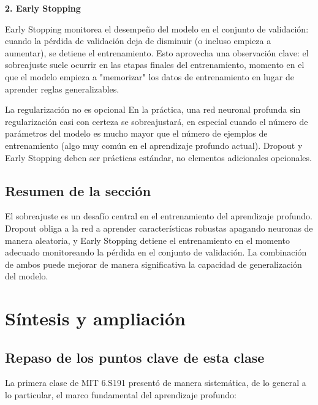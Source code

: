 \documentclass[a4paper]{article}
\begin{document}
\textbf{2. Early Stopping}

Early Stopping monitorea el desempeño del modelo en el conjunto de validación: cuando la pérdida de validación deja de disminuir (o incluso empieza a aumentar), se detiene el entrenamiento. Esto aprovecha una observación clave: el sobreajuste suele ocurrir en las etapas finales del entrenamiento, momento en el que el modelo empieza a "memorizar" los datos de entrenamiento en lugar de aprender reglas generalizables.

\begin{warningbox}{La regularización no es opcional}
En la práctica, una red neuronal profunda sin regularización casi con certeza se sobreajustará, en especial cuando el número de parámetros del modelo es mucho mayor que el número de ejemplos de entrenamiento (algo muy común en el aprendizaje profundo actual). Dropout y Early Stopping deben ser prácticas estándar, no elementos adicionales opcionales.
\end{warningbox}

\subsection{Resumen de la sección}

El sobreajuste es un desafío central en el entrenamiento del aprendizaje profundo. Dropout obliga a la red a aprender características robustas apagando neuronas de manera aleatoria, y Early Stopping detiene el entrenamiento en el momento adecuado monitoreando la pérdida en el conjunto de validación. La combinación de ambos puede mejorar de manera significativa la capacidad de generalización del modelo.
\section{Síntesis y ampliación}

\subsection{Repaso de los puntos clave de esta clase}

La primera clase de MIT 6.S191 presentó de manera sistemática, de lo general a lo particular, el marco fundamental del aprendizaje profundo:
\end{document}
